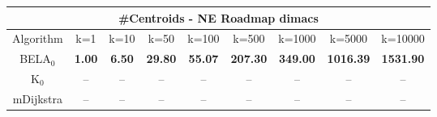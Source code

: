 \begin{tabular}{c|cccccccc}\toprule
\multicolumn{9}{c}{#Centroids - NE Roadmap dimacs}\\ \midrule
Algorithm & k=1 & k=10 & k=50 & k=100 & k=500 & k=1000 & k=5000 & k=10000 \\ \midrule
BELA$_0$ & \textbf{1.00} & \textbf{6.50} & \textbf{29.80} & \textbf{55.07} & \textbf{207.30} & \textbf{349.00} & \textbf{1016.39} & \textbf{1531.90} \\
K$_0$ & -- & -- & -- & -- & -- & -- & -- & -- \\
mDijkstra & -- & -- & -- & -- & -- & -- & -- & -- \\ \bottomrule 
\end{tabular}
